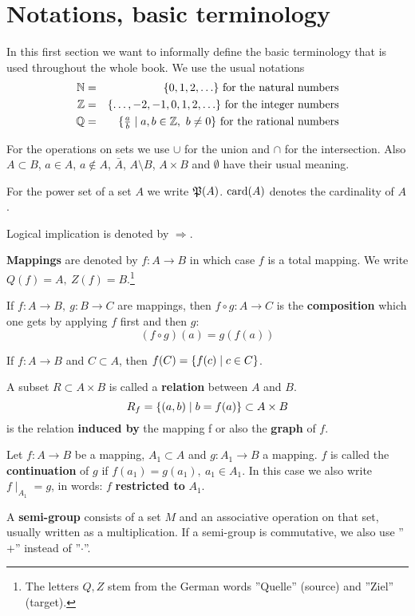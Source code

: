 \section{Notations, basic terminology}

In this first section we want to informally define the basic terminology that is
used throughout the whole book. We use the usual notations
\begin{eqnarray*}
\mathbb{N} &=& \mbox{$\{0, 1, 2, \ldots\}$}\text{ for the natural numbers} \\
\mathbb{Z} &=& \mbox{$\{\ldots, -2, -1, 0, 1, 2, \ldots\}$}\text{ for the integer
numbers} \\
\mathbb{Q} &=& \mbox{$\{\frac{a}{b} \mid a,b \in \mathbb{Z},\ b \neq 0\}$}\text{
for the rational numbers}
\end{eqnarray*}

For the operations on sets we use $\cup$ for the union and $\cap$ for the
intersection. Also $A \subset B$, $a \in A$, $a \not\in A$, $\bar{A}$, $A
\setminus B$, $A \times B$ and $\emptyset$ have their usual meaning.

For the power set of a set $A$ we write $\mathfrak{P}({A})$. $\mathrm{card}({A})$ denotes
the cardinality of $A$.

Logical implication is denoted by $\Rightarrow$.

{\bf Mappings} are denoted by $f : A \to B$ in which case $f$ is a
total mapping. We write $Q(f) = A,\ Z(f) = B$.\footnote{The letters $Q, Z$ stem 
from the German words ''Quelle'' (source) and ''Ziel'' (target).}

If $f: A \to B,\ g : B \to C$ are mappings, then $f \circ g : A
\to C$ is the {\bf composition} which one gets by applying $f$ first and then 
$g$:
\[(f \circ g)(a) = g(f(a))\]

If $f:A \to B$ and $C \subset A$, then $f(C) = \mbox{$\{f(c) \mid c \in C \}$}$.

A subset $R \subset A \times B$ is called a {\bf relation} between $A$ and $B$.
\[R_f = \mbox{$\{(a,b) \mid b = f(a) \}$} \subset A \times B\] 
is the relation {\bf induced by} the mapping f or also the {\bf graph} of $f$.

Let $f : A \to B$ be a mapping, $A_1 \subset A$ and $g : A_1 \to
B$ a mapping. $f$ is called the {\bf continuation} of $g$ if $f(a_1) = g(a_1),\ 
a_1 \in A_1$. In this case we also write $f \mid _{A_1} = g$, in words: $f$ {\bf
restricted to} $A_1$.

A {\bf semi-group} consists of a set $M$ and an associative operation on that
set, usually written as a multiplication. If a semi-group is commutative, we
also use ''$+$'' instead of ''$\cdot$''.

